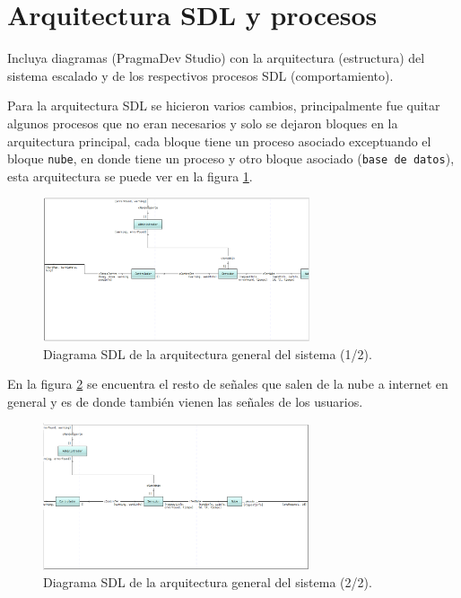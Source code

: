\pagebreak

\section{Arquitectura SDL y procesos}

Incluya diagramas (PragmaDev Studio) con la arquitectura (estructura) del sistema escalado y de los respectivos procesos SDL (comportamiento).

Para la arquitectura SDL se hicieron varios cambios, principalmente fue quitar algunos procesos que no eran necesarios y solo se dejaron bloques en la arquitectura principal, cada bloque tiene un proceso asociado exceptuando el bloque \texttt{nube}, en donde tiene un proceso y otro bloque asociado (\texttt{base de datos}), esta arquitectura se puede ver en la figura \ref{ArquitecturaSDL1}.

\begin{figure}[h]
    \centering
    \includegraphics[width=0.7\textwidth]{images/Arquitectura_SDL1x.png}
    \caption{Diagrama SDL de la arquitectura general del sistema (1/2).}
    \label{ArquitecturaSDL1}
\end{figure}

En la figura \ref{ArquitecturaSDL2} se encuentra el resto de señales que salen de la nube a internet en general y es de donde también vienen las señales de los usuarios.

\begin{figure}[h]
    \centering
    \includegraphics[width=0.7\textwidth]{images/Arquitectura_SDL2x.png}
    \caption{Diagrama SDL de la arquitectura general del sistema (2/2).}
    \label{ArquitecturaSDL2}
\end{figure}

